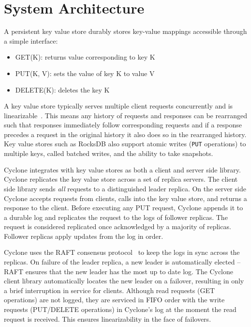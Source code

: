 \documentclass[pageno]{jpaper}
\begin{document}
\section{System Architecture}
\label{sec:sysarch}
A persistent key value store durably stores key-value mappings accessible
through a simple interface:

\begin{itemize}
\item GET(K): returns value corresponding to key K
\item PUT(K, V): sets the value of key K to value V
\item DELETE(K): deletes the key K
\end{itemize}

A key value store typically serves multiple client requests concurrently and is
linearizable~\cite{linearizability}. This means any history of requests and
responses can be rearranged such that responses immediately follow corresponding
requests and if a response precedes a request in the original history it also
does so in the rearranged history. Key value stores such as RocksDB also
support atomic writes ({\tt PUT} operations) to multiple keys, called batched
writes, and the ability to take snapshots.

Cyclone integrates with key value stores as both a client and server side
library. Cyclone replicates the key value store across a set of replica
servers. The client side library sends \emph{all} requests to a distinguished
leader replica.  On the server side Cyclone accepts requests from clients, calls
into the key value store, and returns a response to the client. Before
executing any PUT request, Cyclone appends it to a durable log and replicates
the request to the logs of follower replicas. The request is considered
replicated once acknowledged by a majority of replicas. Follower replicas apply
updates from the log in order.

Cyclone uses the RAFT consensus protocol~\cite{raft} to keep the logs in sync
across the replicas. On failure of the leader replica, a new leader is
automatically elected -- RAFT ensures that the new leader has the most up to
date log. The Cyclone client library automatically locates the new leader on a
failover, resulting in only a brief interruption in service for
clients. Although read requests (GET operations) are not logged, they are
serviced in FIFO order with the write requests (PUT/DELETE operations) in
Cyclone's log at the moment the read request is received. This ensures
linearizability in the face of failovers.
\end{document}
